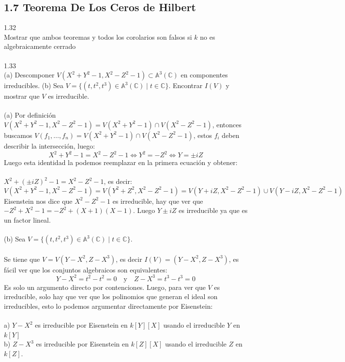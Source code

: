 \documentclass{article}
\newcommand{\A}{\mathbb{A}}
\newcommand{\C}{\mathbb{C}}
\begin{document}
\subsection*{1.7 Teorema De Los Ceros de Hilbert}
1.32
\\
Mostrar que ambos teoremas y todos los corolarios son falsos si $k$ no es algebraicamente cerrado
\\
\\
1.33
\\
(a) Descomponer $V(X^2+Y^2-1,X^2-Z^2-1) \subset \A^{3}(\C)$ en componentes irreducibles. (b) Sea $V=\{(t,t^2,t^3) \in \A^{3}(\C) \mid t \in \C \}$. Encontrar $I(V)$ y mostrar que $V$ es irreducible.
\\
\\
(a) Por definición $V(X^2+Y^2-1,X^2-Z^2-1)=V(X^2+Y^2-1) \cap V(X^2-Z^2-1)$, entonces buscamos $V(f_1,\dots,f_n)=V(X^2+Y^2-1) \cap V(X^2-Z^2-1)$, estos $f_i$ deben describir la intersección, luego:
\begin{equation*}
    X^2+Y^2-1=X^2-Z^2-1 \Longleftrightarrow Y^2=-Z^2 \Longleftrightarrow Y=\pm iZ
\end{equation*}
Luego esta identidad la podemos reemplazar en la primera ecuación y obtener:
\\
\\
$X^2+(\pm i Z)^2-1=X^2-Z^2-1$, es decir:
\begin{equation*}
    V(X^2+Y^2-1,X^2-Z^2-1)=V(Y^2+Z^2,X^2-Z^2-1)=V(Y+iZ,X^2-Z^2-1) \cup V(Y-iZ, X^2-Z^2-1)
\end{equation*}
Eisenstein nos dice que $X^2-Z^2-1$ es irreducible, hay que ver que $-Z^2+X^2-1=-Z^2+(X+1)(X-1)$. Luego $Y \pm iZ$ es irreducible ya que es un factor lineal.
\\
\\ 
(b) Sea $V=\{(t,t^2,t^3) \in \A^3(\C) \mid t \in \C \}$.
\\
\\
Se tiene que $V=V(Y-X^2,Z-X^3)$, es decir $I(V)=(Y-X^2,Z-X^3)$, es fácil ver que los conjuntos algebraicos son equivalentes:
\begin{equation*}
    Y-X^2=t^2-t^2=0 \quad \text{y} \quad Z-X^3=t^3-t^3=0
\end{equation*}
Es solo un argumento directo por contenciones. Luego, para ver que $V$ es irreducible, solo hay que ver que los polinomios que generan el ideal son irreducibles, esto lo podemos argumentar directamente por Eisenstein:
\\
\\
a) $Y-X^2$ es irreducible por Eisenstein en $k[Y][X]$ usando el irreducible $Y$ en $k[Y]$
\\
b) $Z-X^3$ es irreducible por Eisenstein en $k[Z][X]$ usando el irreducible $Z$ en $k[Z]$.
\end{document}
